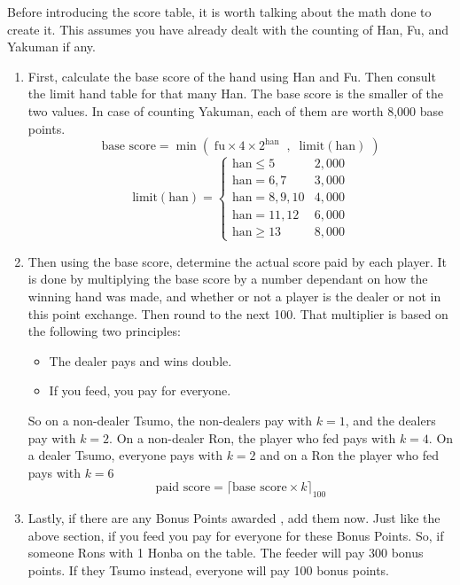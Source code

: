 Before introducing the score table, it is worth talking about the math done to create it. This assumes you have already dealt with the counting of Han, Fu, and Yakuman if any.

\begin{enumerate}
	\item First, calculate the base score of the hand using Han and Fu. Then consult the limit hand table for that many Han. The base score is the smaller of the two values. In case of counting Yakuman, each of them are worth 8,000 base points.
	\[\text{base score} = \min\left(\;\text{fu} \times 4 \times 2^{\text{han}} \;\;,\;\; \text{limit}(\text{han})\;\right)\]
	\[\text{limit}(\text{han}) = \begin{cases}\text{han} \le 5 & 2,000 \\ \text{han} = 6,7 & 3,000 \\ \text{han} = 8,9,10 & 4,000 \\ \text{han} = 11,12 & 6,000 \\ \text{han} \ge 13 & 8,000\end{cases}\]

	\item Then using the base score, determine the actual score paid by each player. It is done by multiplying the base score by a number dependant on how the winning hand was made, and whether or not a player is the dealer or not in this point exchange. Then round to the next 100.
	That multiplier is based on the following two principles:
		\begin{itemize}
		\item The dealer pays and wins double.
		\item If you feed, you pay for everyone.
	\end{itemize}
	So on a non-dealer Tsumo, the non-dealers pay with \(k=1\), and the dealers pay with \(k=2\). On a non-dealer Ron, the player who fed pays with \(k=4\). On a dealer Tsumo, everyone pays with \(k=2\) and on a Ron the player who fed pays with \(k=6\)
	\[\text{paid score} = \lceil\text{base score} \times k\rceil_{100}\]

	\item Lastly, if there are any Bonus Points awarded , add them now. Just like the above section, if you feed you pay for everyone for these Bonus Points.
	So, if someone Rons with 1 Honba on the table. The feeder will pay 300 bonus points. If they Tsumo instead, everyone will pay 100 bonus points.
\end{enumerate}


